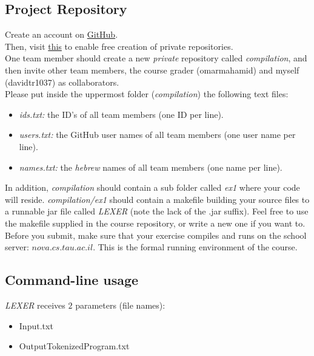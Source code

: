 \documentclass{article}
\begin{document}
\subsection{Project Repository}
Create an account on \href{https://github.com/}{GitHub}. \\
Then, visit \href{https://education.github.com/pack}{this} to enable free creation of private repositories. \\
One team member should create a new \textit{private} repository called \textit{compilation},
and then invite other team members, the course grader (omarmahamid) and myself (davidtr1037) as collaborators. \\
Please put inside the uppermost folder (\textit{compilation}) the following text files:
\begin{itemize}
    \item \textit{ids.txt:} the ID's of all team members (one ID per line).
    \item \textit{users.txt:} the GitHub user names of all team members (one user name per line).
    \item \textit{names.txt:} the \textit{hebrew} names of all team members (one name per line).
\end{itemize}

In addition, \textit{compilation} should contain a sub folder called \textit{ex1} where your code will reside.
\textit{compilation/ex1} should contain a makefile building your source files to a
runnable jar file called \textit{LEXER} (note the lack of the .jar suffix).
Feel free to use the makefile supplied in the course repository,
or write a new one if you want to. 
Before you submit, make sure that your exercise compiles and runs
on the school server: $nova.cs.tau.ac.il$.
This is the formal running environment of the course.

\subsection{Command-line usage}
\textit{LEXER} receives $2$ parameters (file names):
\begin{itemize}
\item Input.txt
\item OutputTokenizedProgram.txt
\end{itemize}
\end{document}
